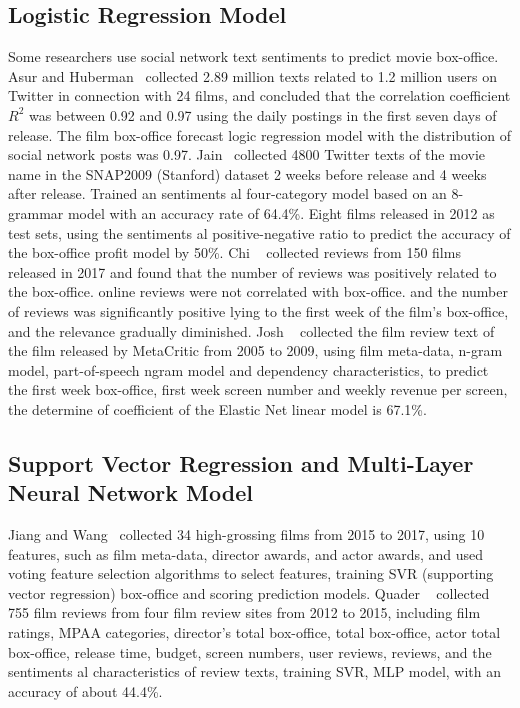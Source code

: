 \documentclass[review]{cvpr}
\begin{document}
\subsection{Logistic Regression Model}

Some researchers use social network text sentiments to predict movie box-office.
Asur and Huberman~\cite{asur2010predicting} collected 2.89 million texts related to 1.2 million users on Twitter in connection with 24 films, and concluded that the correlation coefficient $R^2$ was between 0.92 and 0.97 using the daily postings in the first seven days of release.
The film box-office forecast logic regression model with the distribution of social network posts was 0.97.
Jain~\cite{jain2013prediction} collected 4800 Twitter texts of the movie name in the SNAP2009 (Stanford) dataset 2 weeks before release and 4 weeks after release.
Trained an sentiments al four-category model based on an 8-grammar model with an accuracy rate of 64.4\%.
Eight films released in 2012 as test sets, using the sentiments al positive-negative ratio to predict the accuracy of the box-office profit model by 50\%.
Chi \etal~\cite{chi2019does} collected reviews from 150 films released in 2017 and found that the number of reviews was positively related to the box-office.
online reviews were not correlated with box-office. and the number of reviews was significantly positive lying to the first week of the film's box-office, and the relevance gradually diminished.
Josh \etal~\cite{joshi2010movie} collected the film review text of the film released by MetaCritic from 2005 to 2009, using film meta-data, n-gram model, part-of-speech ngram model and dependency characteristics, to predict the first week box-office,
first week screen number and weekly revenue per screen, the determine of coefficient of the Elastic Net linear model is 67.1\%.

\subsection{Support Vector Regression and Multi-Layer Neural Network Model}

Jiang and Wang~\cite{jiang2018predicting} collected 34 high-grossing films from 2015 to 2017, using 10 features, such as film meta-data, director awards, and actor awards, and used voting feature selection algorithms to select features, training SVR (supporting vector regression) box-office and scoring prediction models.
Quader \etal~\cite{quader2017machine} collected 755 film reviews from four film review sites from 2012 to 2015, including film ratings, MPAA categories, director's total box-office, total box-office, actor total box-office, release time, budget, screen numbers, user reviews, reviews, and the sentiments al characteristics of review texts,
training SVR, MLP model, with an accuracy of about 44.4\%.
\end{document}
